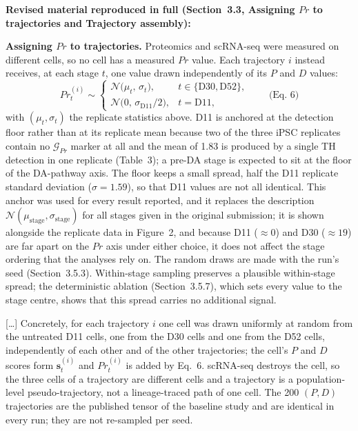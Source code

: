 \documentclass[11pt]{article}
\newcommand{\revisedheading}[1]{\medskip\noindent\textbf{Revised material
  reproduced in full (#1):}\par}
\newenvironment{revised}{\par\color{red}}{\par}
\begin{document}
\revisedheading{Section~3.3, Assigning $Pr$ to trajectories and Trajectory assembly}
\begin{revised}
\textbf{Assigning $Pr$ to trajectories.} Proteomics and scRNA-seq were measured on different cells, so no cell has a measured $Pr$ value. Each trajectory $i$ instead receives, at each stage $t$, one value drawn independently of its $P$ and $D$ values:
\begin{equation*}
  Pr^{(i)}_{t} \sim
  \begin{cases}
    \mathcal{N}\bigl(\mu_{t},\, \sigma_{t}\bigr), & t \in \{\text{D30}, \text{D52}\},\\[2pt]
    \mathcal{N}\bigl(0,\, \sigma_{\text{D11}}/2\bigr), & t = \text{D11},
  \end{cases}
  \qquad\text{(Eq.~6)}
\end{equation*}
with $(\mu_{t}, \sigma_{t})$ the replicate statistics above. D11 is anchored at the detection floor rather than at its replicate mean because two of the three iPSC replicates contain no $\mathcal{G}_{Pr}$ marker at all and the mean of 1.83 is produced by a single TH detection in one replicate (Table~3); a pre-DA stage is expected to sit at the floor of the DA-pathway axis. The floor keeps a small spread, half the D11 replicate standard deviation ($\sigma = 1.59$), so that D11 values are not all identical. This anchor was used for every result reported, and it replaces the description $\mathcal{N}(\mu_{\text{stage}}, \sigma_{\text{stage}})$ for all stages given in the original submission; it is shown alongside the replicate data in Figure~2, and because D11 ($\approx 0$) and D30 ($\approx 19$) are far apart on the $Pr$ axis under either choice, it does not affect the stage ordering that the analyses rely on. The random draws are made with the run's seed (Section~3.5.3). Within-stage sampling preserves a plausible within-stage spread; the deterministic ablation (Section~3.5.7), which sets every value to the stage centre, shows that this spread carries no additional signal.

[\ldots] Concretely, for each trajectory $i$ one cell was drawn uniformly at random from the untreated D11 cells, one from the D30 cells and one from the D52 cells, independently of each other and of the other trajectories; the cell's $P$ and $D$ scores form $\mathbf{s}^{(i)}_{t}$ and $Pr^{(i)}_{t}$ is added by Eq.~6. scRNA-seq destroys the cell, so the three cells of a trajectory are different cells and a trajectory is a population-level pseudo-trajectory, not a lineage-traced path of one cell. The 200 $(P, D)$ trajectories are the published tensor of the baseline study and are identical in every run; they are not re-sampled per seed.
\end{revised}
\end{document}
